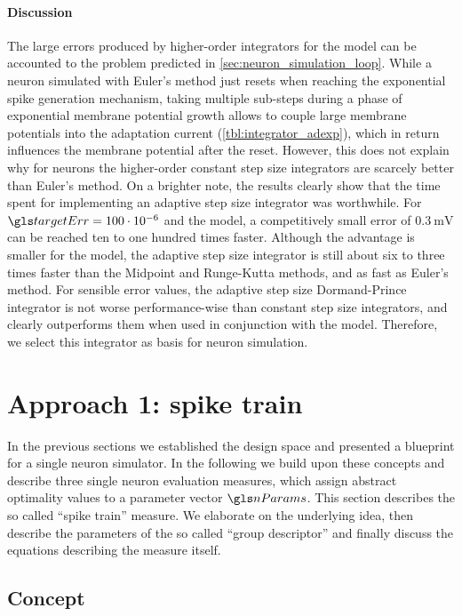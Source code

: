 \paragraph{Discussion}
The large errors produced by higher-order integrators for the \AdEx model can be accounted to the problem predicted in \cref{sec:neuron_simulation_loop}. While a neuron simulated with Euler's method just resets when reaching the exponential spike generation mechanism, taking multiple sub-steps during a phase of exponential membrane potential growth allows to couple large membrane potentials into the adaptation current \Ga (\cref{tbl:integrator_adexp}), which in return influences the membrane potential after the reset. However, this does not explain why for \LIF neurons the higher-order constant step size integrators are scarcely better than Euler's method. On a brighter note, the results clearly show that the time spent for implementing an adaptive step size integrator was worthwhile. For $\targetErr = 100\cdot10^{-6}$ and the \AdEx model, a competitively small error of $\SI{0.3}{\milli\volt}$ can be reached ten to one hundred times faster. Although the advantage is smaller for the \LIF model, the adaptive step size integrator is still about six to three times faster than the Midpoint and Runge-Kutta methods, and as fast as Euler's method. For sensible error values, the adaptive step size Dormand-Prince integrator is not worse performance-wise than constant step size integrators, and clearly outperforms them when used in conjunction with the \AdEx model. Therefore, we select this integrator as basis for neuron simulation.

\section{Approach 1: spike train}
\label{sec:spike_train_measure}

In the previous sections we established the design space and presented a blueprint for a single neuron simulator. In the following we build upon these concepts and describe three single neuron evaluation measures, which assign abstract optimality values \Pgen to a parameter vector $\nParams$. This section describes the so called \enquote{spike train} measure. We elaborate on the underlying idea, then describe the parameters of the so called \enquote{group descriptor} and finally discuss the equations describing the measure itself.

\subsection{Concept}

